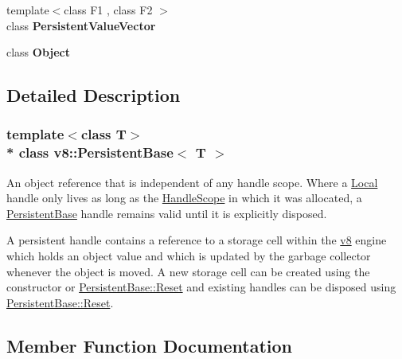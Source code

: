 \begin{DoxyCompactItemize}
\item 
{\footnotesize template$<$class F1 , class F2 $>$ }\\class {\bfseries Persistent\+Value\+Vector}\hypertarget{classv8_1_1PersistentBase_a978bb1377559897d74d5fe883a54a315}{}\label{classv8_1_1PersistentBase_a978bb1377559897d74d5fe883a54a315}

\item 
class {\bfseries Object}\hypertarget{classv8_1_1PersistentBase_a0720b5f434e636e22a3ed34f847eec57}{}\label{classv8_1_1PersistentBase_a0720b5f434e636e22a3ed34f847eec57}

\end{DoxyCompactItemize}


\subsection{Detailed Description}
\subsubsection*{template$<$class T$>$\\*
class v8\+::\+Persistent\+Base$<$ T $>$}

An object reference that is independent of any handle scope. Where a \hyperlink{classv8_1_1Local}{Local} handle only lives as long as the \hyperlink{classv8_1_1HandleScope}{Handle\+Scope} in which it was allocated, a \hyperlink{classv8_1_1PersistentBase}{Persistent\+Base} handle remains valid until it is explicitly disposed.

A persistent handle contains a reference to a storage cell within the \hyperlink{namespacev8}{v8} engine which holds an object value and which is updated by the garbage collector whenever the object is moved. A new storage cell can be created using the constructor or \hyperlink{classv8_1_1PersistentBase_a174bb1e45b18fd4eeaee033622825bb8}{Persistent\+Base\+::\+Reset} and existing handles can be disposed using \hyperlink{classv8_1_1PersistentBase_a174bb1e45b18fd4eeaee033622825bb8}{Persistent\+Base\+::\+Reset}. 

\subsection{Member Function Documentation}
